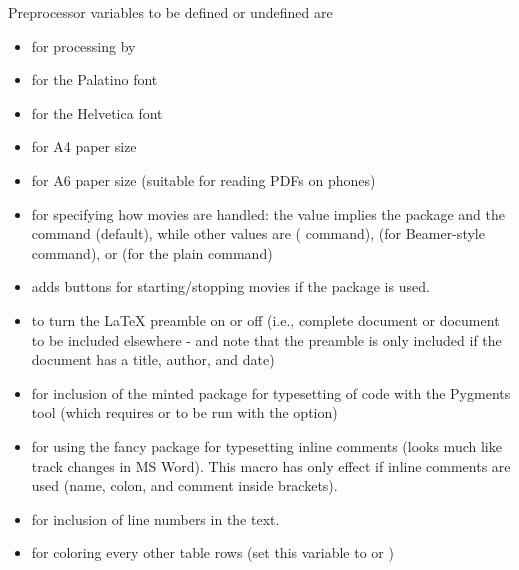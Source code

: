 \documentclass[%
oneside,                 %
final,                   %
10pt]{article}
\begin{document}
Preprocessor variables to be defined or undefined are

\begin{itemize}
 \item {} for processing by 

 \item {} for the Palatino font

 \item {} for the Helvetica font

 \item {} for A4 paper size

 \item {} for A6 paper size (suitable for reading PDFs on phones)

 \item {} for specifying how movies are handled: the value 
   implies the  package and the  command (default),
   while other values are  ( command),
    (for Beamer-style \code{\movie} command),
   or  (for the plain  command)

 \item {} adds buttons for starting/stopping movies if the
    package is used.

 \item {} to turn the {\LaTeX} preamble on or off (i.e., complete document
   or document to be included elsewhere - and note that
   the preamble is only included
   if the document has a title, author, and date)

 \item {} for inclusion of the minted package for typesetting of
   code with the Pygments tool (which requires 
   or  to be run with the  option)

 \item {} for using the fancy  package for typesetting
   inline comments (looks much like track changes in MS Word). This
   macro has only effect if inline comments are used (name, colon,
   and comment inside brackets).

 \item {} for inclusion of line numbers in the text.

 \item {} for coloring every other table rows (set this
   variable to  or )


\end{itemize}
\end{document}
